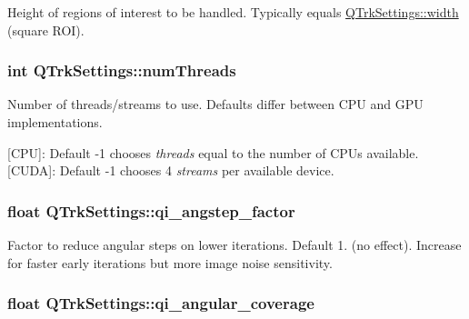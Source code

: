 Height of regions of interest to be handled. Typically equals \hyperlink{struct_q_trk_settings_aef24eb3a4692bd67ff1aca8ef950e08d}{Q\+Trk\+Settings\+::width} (square R\+OI). 

\subsubsection[{\texorpdfstring{num\+Threads}{numThreads}}]{\setlength{\rightskip}{0pt plus 5cm}int Q\+Trk\+Settings\+::num\+Threads}\hypertarget{struct_q_trk_settings_a8c6f1c671b527155afd5dad894c152da}{}\label{struct_q_trk_settings_a8c6f1c671b527155afd5dad894c152da}


Number of threads/streams to use. Defaults differ between C\+PU and G\+PU implementations. 

\mbox{[}C\+PU\mbox{]}\+: Default -\/1 chooses {\itshape threads} equal to the number of C\+P\+Us available. ~\newline
 \mbox{[}C\+U\+DA\mbox{]}\+: Default -\/1 chooses 4 {\itshape streams} per available device. 
\subsubsection[{\texorpdfstring{qi\+\_\+angstep\+\_\+factor}{qi_angstep_factor}}]{\setlength{\rightskip}{0pt plus 5cm}float Q\+Trk\+Settings\+::qi\+\_\+angstep\+\_\+factor}\hypertarget{struct_q_trk_settings_aceebf67ba9ecc215d49c6b2739afae3d}{}\label{struct_q_trk_settings_aceebf67ba9ecc215d49c6b2739afae3d}


Factor to reduce angular steps on lower iterations. Default 1. (no effect). Increase for faster early iterations but more image noise sensitivity. 

\subsubsection[{\texorpdfstring{qi\+\_\+angular\+\_\+coverage}{qi_angular_coverage}}]{\setlength{\rightskip}{0pt plus 5cm}float Q\+Trk\+Settings\+::qi\+\_\+angular\+\_\+coverage}\hypertarget{struct_q_trk_settings_a08800ed7809dc4bde16d0a6fee08ecdd}{}\label{struct_q_trk_settings_a08800ed7809dc4bde16d0a6fee08ecdd}


